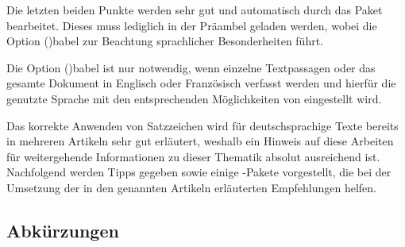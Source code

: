 \documentclass[%
  english,ngerman,%
  cdgeometry=no,DIV=12,%
  cd=false,cdfont=false,cdtitle=true,%
  headings=normal,%
  automark,%
  listof=toc,%
]{tudscrartcl}
\begin{document}
\noindent Die letzten beiden Punkte werden sehr gut und automatisch durch das 
Paket  bearbeitet. Dieses muss lediglich in der Präambel 
geladen werden, wobei die Option \Option(){babel} zur 
Beachtung sprachlicher Besonderheiten führt.
%
\begin{Preamble}
\usepackage[babel]{microtype}

\end{Preamble}
%
Die Option \Option(){babel} ist nur notwendig, wenn einzelne 
Textpassagen oder das gesamte Dokument in Englisch oder Französisch verfasst 
werden und hierfür die genutzte Sprache mit den entsprechenden Möglichkeiten 
von  eingestellt wird.

Das korrekte Anwenden von Satzzeichen wird für deutschsprachige Texte bereits 
in mehreren Artikeln \cite{neubauer1996,neubauer1997,struckmann2007,bier2009} 
sehr gut erläutert, weshalb ein Hinweis auf diese Arbeiten für weitergehende 
Informationen zu dieser Thematik absolut ausreichend ist. Nachfolgend werden 
Tipps gegeben sowie einige -Pakete vorgestellt, die bei der 
Umsetzung der in den genannten Artikeln erläuterten Empfehlungen helfen.



\subsection{Abkürzungen}
\end{document}

